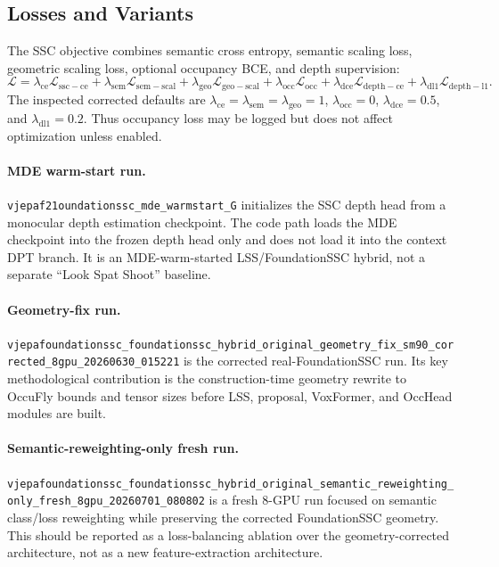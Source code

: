 \documentclass[10pt]{article}
\newcommand{\codepath}[1]{\begingroup\small\nolinkurl{#1}\endgroup}
\begin{document}
\subsection{Losses and Variants}
The SSC objective combines semantic cross entropy, semantic scaling loss, geometric scaling loss, optional occupancy BCE, and depth supervision:
\[
\mathcal{L}=
\lambda_{\mathrm{ce}}\mathcal{L}_{\mathrm{ssc-ce}}
+\lambda_{\mathrm{sem}}\mathcal{L}_{\mathrm{sem-scal}}
+\lambda_{\mathrm{geo}}\mathcal{L}_{\mathrm{geo-scal}}
+\lambda_{\mathrm{occ}}\mathcal{L}_{\mathrm{occ}}
+\lambda_{\mathrm{dce}}\mathcal{L}_{\mathrm{depth-ce}}
+\lambda_{\mathrm{dl1}}\mathcal{L}_{\mathrm{depth-l1}}.
\]
The inspected corrected defaults are \(\lambda_{\mathrm{ce}}=\lambda_{\mathrm{sem}}=\lambda_{\mathrm{geo}}=1\), \(\lambda_{\mathrm{occ}}=0\), \(\lambda_{\mathrm{dce}}=0.5\), and \(\lambda_{\mathrm{dl1}}=0.2\).  Thus occupancy loss may be logged but does not affect optimization unless enabled.

\paragraph{MDE warm-start run.}
\codepath{vjepaf21oundationssc_mde_warmstart_G} initializes the SSC depth head from a monocular depth estimation checkpoint.  The code path loads the MDE checkpoint into the frozen depth head only and does not load it into the context DPT branch.  It is an MDE-warm-started LSS/FoundationSSC hybrid, not a separate ``Look Spat Shoot'' baseline.

\paragraph{Geometry-fix run.}
\codepath{vjepafoundationssc_foundationssc_hybrid_original_geometry_fix_sm90_corrected_8gpu_20260630_015221} is the corrected real-FoundationSSC run.  Its key methodological contribution is the construction-time geometry rewrite to OccuFly bounds and tensor sizes before LSS, proposal, VoxFormer, and OccHead modules are built.

\paragraph{Semantic-reweighting-only fresh run.}
\codepath{vjepafoundationssc_foundationssc_hybrid_original_semantic_reweighting_only_fresh_8gpu_20260701_080802} is a fresh 8-GPU run focused on semantic class/loss reweighting while preserving the corrected FoundationSSC geometry.  This should be reported as a loss-balancing ablation over the geometry-corrected architecture, not as a new feature-extraction architecture.
\end{document}
